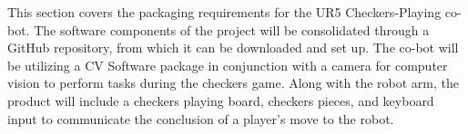 

This section covers the packaging requirements for the UR5 Checkers-Playing co-bot. The software components of the project will be consolidated through a GitHub repository, from which it can be downloaded and set up. The co-bot will be utilizing a CV Software package in conjunction with a camera for computer vision to perform tasks during the checkers game. Along with the robot arm, the product will include a checkers playing board, checkers pieces, and keyboard input to communicate the conclusion of a player's move to the robot.

